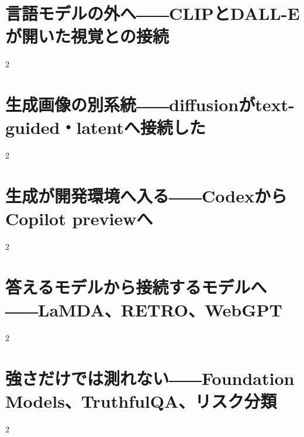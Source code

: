 \documentclass[lualatex,a4paper,11pt]{jlreq}
\begin{document}
\section{言語モデルの外へ――CLIPとDALL-Eが開いた視覚との接続}
\label{pkg:multimodal-substrate}

\medskip
\begin{multicols}{2}

\end{multicols}


\Needspace{0.45\textheight}
\bigskip
\section{生成画像の別系統――diffusionがtext-guided・latentへ接続した}
\label{pkg:diffusion-media}

\medskip
\begin{multicols}{2}

\end{multicols}


\Needspace{0.45\textheight}
\bigskip
\section{生成が開発環境へ入る――CodexからCopilot previewへ}
\label{pkg:code-developer-interface}

\medskip
\begin{multicols}{2}

\end{multicols}


\Needspace{0.45\textheight}
\bigskip
\section{答えるモデルから接続するモデルへ――LaMDA、RETRO、WebGPT}
\label{pkg:dialogue-retrieval-grounding}

\medskip
\begin{multicols}{2}

\end{multicols}


\Needspace{0.45\textheight}
\bigskip
\section{強さだけでは測れない――Foundation Models、TruthfulQA、リスク分類}
\label{pkg:evaluation-risk-foundation}

\medskip
\begin{multicols}{2}

\end{multicols}

\end{document}
